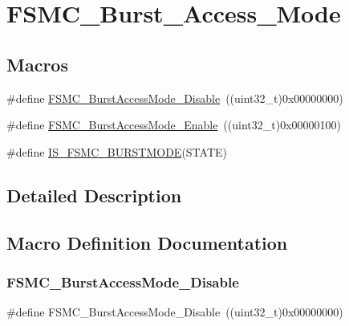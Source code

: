 \hypertarget{group___f_s_m_c___burst___access___mode}{}\section{F\+S\+M\+C\+\_\+\+Burst\+\_\+\+Access\+\_\+\+Mode}
\label{group___f_s_m_c___burst___access___mode}
\subsection*{Macros}
\begin{DoxyCompactItemize}
\item 
\#define \mbox{\hyperlink{group___f_s_m_c___burst___access___mode_ga26fc544945415e350563a9b00684850c}{F\+S\+M\+C\+\_\+\+Burst\+Access\+Mode\+\_\+\+Disable}}~((uint32\+\_\+t)0x00000000)
\item 
\#define \mbox{\hyperlink{group___f_s_m_c___burst___access___mode_ga841831dfacfdd8889dafe26cc594bf02}{F\+S\+M\+C\+\_\+\+Burst\+Access\+Mode\+\_\+\+Enable}}~((uint32\+\_\+t)0x00000100)
\item 
\#define \mbox{\hyperlink{group___f_s_m_c___burst___access___mode_gaf8736659c5064c3c03753d7874401e71}{I\+S\+\_\+\+F\+S\+M\+C\+\_\+\+B\+U\+R\+S\+T\+M\+O\+DE}}(S\+T\+A\+TE)
\end{DoxyCompactItemize}


\subsection{Detailed Description}


\subsection{Macro Definition Documentation}
\mbox{\label{group___f_s_m_c___burst___access___mode_ga26fc544945415e350563a9b00684850c}} 
\subsubsection{\texorpdfstring{FSMC\_BurstAccessMode\_Disable}{FSMC\_BurstAccessMode\_Disable}}
{\footnotesize\ttfamily \#define F\+S\+M\+C\+\_\+\+Burst\+Access\+Mode\+\_\+\+Disable~((uint32\+\_\+t)0x00000000)}

